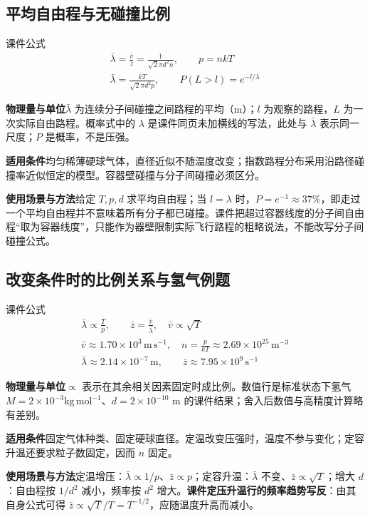 \documentclass[UTF8,fontset=none,zihao=-4,a4paper]{ctexart}
\newcommand{\unit}[1]{\,\mathrm{#1}}
\newcommand{\explain}[3]{\par\noindent\textbf{物理量与单位}\quad #1\par
\noindent\textbf{适用条件}\quad #2\par
\noindent\textbf{使用场景与方法}\quad #3\par}
\begin{document}
\par\noindent\begin{minipage}{\linewidth}
\subsection{平均自由程与无碰撞比例}
\begin{infobox}[breakable=false]{课件公式}
\begin{gather*}\bar\lambda=\frac{\bar v}{\bar z}=\frac1{\sqrt2\pi d^2n},\qquad p=nkT\\\bar\lambda=\frac{kT}{\sqrt2\pi d^2p},\qquad P(L>l)=e^{-l/\lambda}\end{gather*}
\end{infobox}
\end{minipage}\par
\explain{$\bar\lambda$ 为连续分子间碰撞之间路程的平均（m）；$l$ 为观察的路程，$L$ 为一次实际自由路程。概率式中的 $\lambda$ 是课件同页未加横线的写法，此处与 $\bar\lambda$ 表示同一尺度；$P$ 是概率，不是压强。}{均匀稀薄硬球气体，直径近似不随温度改变；指数路程分布采用沿路径碰撞率近似恒定的模型。容器壁碰撞与分子间碰撞必须区分。}{给定 $T,p,d$ 求平均自由程；当 $l=\lambda$ 时，$P=e^{-1}\approx37\%$，即走过一个平均自由程并不意味着所有分子都已碰撞。课件把超过容器线度的分子间自由程“取为容器线度”，只能作为器壁限制实际飞行路程的粗略说法，不能改写分子间碰撞公式。}


\par\noindent\begin{minipage}{\linewidth}
\subsection{改变条件时的比例关系与氢气例题}
\begin{infobox}[breakable=false]{课件公式}
\begin{gather*}\bar\lambda\propto\frac Tp,\qquad\bar z=\frac{\bar v}{\bar\lambda},\quad\bar v\propto\sqrt T\\\bar v\approx1.70\times10^3\unit{m\,s^{-1}},\quad n=\frac p{kT}\approx2.69\times10^{25}\unit{m^{-3}}\\\bar\lambda\approx2.14\times10^{-7}\unit m,\qquad\bar z\approx7.95\times10^9\unit{s^{-1}}\end{gather*}
\end{infobox}
\end{minipage}\par
\explain{$\propto$ 表示在其余相关因素固定时成比例。数值行是标准状态下氢气 $M=2\times10^{-3}\mathrm{kg\,mol^{-1}}$、$d=2\times10^{-10}$ m 的课件结果；舍入后数值与高精度计算略有差别。}{固定气体种类、固定硬球直径。定温改变压强时，温度不参与变化；定容升温还要求粒子数固定，因而 $n$ 固定。}{定温增压：$\bar\lambda\propto1/p$、$\bar z\propto p$；定容升温：$\bar\lambda$ 不变、$\bar z\propto\sqrt T$；增大 $d$：自由程按 $1/d^2$ 减小，频率按 $d^2$ 增大。\textbf{课件定压升温行的频率趋势写反}：由其自身公式可得 $\bar z\propto\sqrt T/T=T^{-1/2}$，应随温度升高而减小。}
\end{document}
